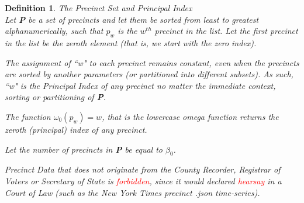 \documentclass[preprint,13pt]{elsarticle}
\newtheorem{definition}{Definition}[section]
\begin{document}
\begin{definition}{The Precinct Set and Principal Index}\\
Let \textbf{P} be a set of precincts and let them be sorted from least to greatest alphanumerically, such that $p_{w}$ is the $w^{th}$ precinct in the list. Let the first precinct in the list be the zeroth element (that is, we start with the zero index).

The assignment of ``w" to each precinct remains constant, even when the precincts are sorted by another parameters (or partitioned into different subsets). As such, ``w" is the Principal Index of any precinct no matter the immediate context, sorting or partitioning of \textbf{P}.

The function $\omega_{0}(p_{w})=w$, that is the lowercase omega function returns the zeroth (principal) index of any precinct.

Let the number of precincts in \textbf{P} be equal to $\beta_{0}$.

Precinct Data that does not originate from the County Recorder, Registrar of Voters or Secretary of State is 
\textcolor{red}{forbidden}, since it would declared \textcolor{red}{hearsay} in a Court of Law (such as the New York Times precinct .json time-series).
\end{definition}
\end{document}
